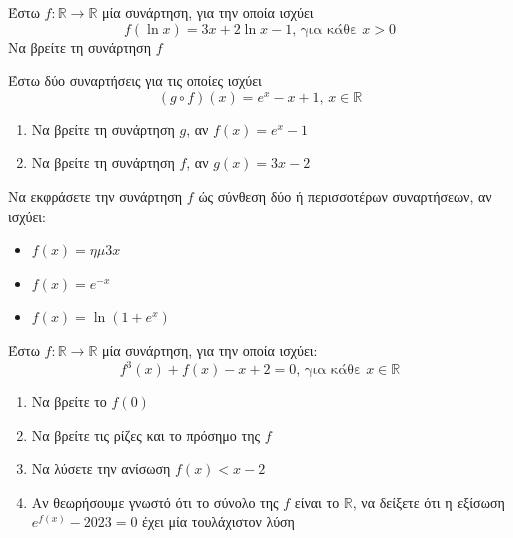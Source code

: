 \documentclass{presentation}
\begin{document}
\begin{askisi}
      Έστω $f:\mathbb{R}\to\mathbb{R}$ μία συνάρτηση, για την οποία ισχύει
      $$f(\ln x)=3x+2\ln x -1\text{, για κάθε } x>0$$
      Να βρείτε τη συνάρτηση $f$

\end{askisi}

\begin{askisi}
      Έστω δύο συναρτήσεις για τις οποίες ισχύει
      $$(g\circ f)(x)=e^x-x+1\text{, } x\in\mathbb{R}$$
      \begin{enumerate}
            \item<1-> Να βρείτε τη συνάρτηση $g$, αν $f(x)=e^x-1$
            \item<2-> Να βρείτε τη συνάρτηση $f$, αν $g(x)=3x-2$
      \end{enumerate}

\end{askisi}

\begin{askisi}
      Να εκφράσετε την συνάρτηση $f$ ώς σύνθεση δύο ή περισσοτέρων συναρτήσεων, αν ισχύει:
      \begin{itemize}
            \item $f(x)=ημ 3x$
            \item $f(x)=e^{-x}$
            \item $f(x)=\ln (1+e^x)$
      \end{itemize}

\end{askisi}

\begin{askisi}
      Έστω $f:\mathbb{R}\to\mathbb{R}$ μία συνάρτηση, για την οποία ισχύει:
      $$f^3(x)+f(x)-x+2=0\text{, για κάθε } x\in\mathbb{R}$$
      \begin{enumerate}
            \item<1-> Να βρείτε το $f(0)$
            \item<2-> Να βρείτε τις ρίζες και το πρόσημο της $f$
            \item<3-> Να λύσετε την ανίσωση $f(x)<x-2$
            \item<4-> Αν θεωρήσουμε γνωστό ότι το σύνολο της $f$ είναι το $\mathbb{R}$, να δείξετε ότι η εξίσωση $e^{f(x)}-2023=0$ έχει μία τουλάχιστον λύση
      \end{enumerate}

\end{askisi}
\end{document}
